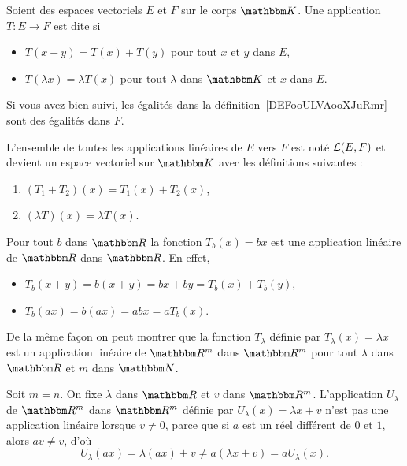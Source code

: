 \begin{definition}      \label{DEFooULVAooXJuRmr}
    Soient des espaces vectoriels \( E \) et \( F\) sur le corps \( \eK\). Une application \( T\colon E\to F\) est dite  si
    \begin{itemize}
        \item $T(x+y)=T(x)+T(y)$ pour tout $x$ et $y$ dans \( E\),
        \item $T(\lambda x)=\lambda T(x)$ pour tout $\lambda$ dans $\eK$ et \( x\) dans \( E\).
    \end{itemize}
\end{definition}
Si vous avez bien suivi, les égalités dans la définition~\ref{DEFooULVAooXJuRmr} sont des égalités dans \( F\).

\begin{lemmaDef} \label{DefDQRooVGbzSm}
    L'ensemble de toutes les applications linéaires de \( E\) vers \( F\) est noté \( \mathcal{L}(E,F)\) et devient un espace vectoriel sur \( \eK\) avec les définitions suivantes :
    \begin{enumerate}
        \item
            \( (T_1+T_2)(x)=T_1(x)+T_2(x)\),
        \item
            \( (\lambda T)(x)=\lambda T(x)\).
    \end{enumerate}
\end{lemmaDef}

\begin{example}
Pour tout $b$ dans $\eR$ la fonction $T_b(x)= bx$ est une application linéaire de $\eR$ dans $\eR$. En effet,
\begin{itemize}
\item  $T_b(x+y)= b(x+y)= bx + by = T_b(x)+T_b(y)$,
\item $T_b(ax)=b(ax)= abx = a T_b(x)$.
\end{itemize}
De la même façon on peut montrer que la fonction $T_{\lambda}$ définie par $T_{\lambda}(x)=\lambda x$ est un application linéaire de $\eR^m$ dans $\eR^m$ pour tout $\lambda$ dans $\eR$ et $m$ dans $\eN$.
\end{example}

\begin{example}\label{ex_affine}
	Soit $m=n$. On fixe $\lambda$ dans $\eR$ et $v$ dans $\eR^m$. L'application $U_{\lambda}$ de $\eR^m$ dans $\eR^m$ définie par $U_{\lambda}(x)=\lambda x+v$ n'est pas une application linéaire lorsque \( v \neq 0 \), parce que si \( a \) est un réel différent de \(0 \) et \( 1 \), alors \( av \neq v \), d'où
\[
U_{\lambda}(ax)=\lambda(ax)+v\neq a(\lambda x+v) =a U_{\lambda}(x).
\]
\end{example}

